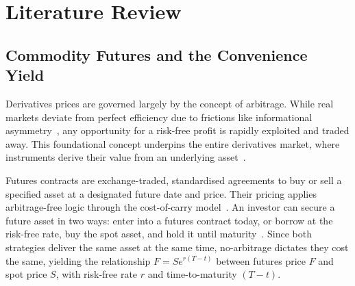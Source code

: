 \documentclass[sigconf, authorversion=true, nonacm=true]{acmart}
\begin{document}



\section{Literature Review}
\label{sec:literature}

\subsection{Commodity Futures and the Convenience Yield}
\label{sec:fin_fun}
\label{sec:lit_commodity_merged}
Derivatives prices are governed largely by the concept of arbitrage. While real markets deviate from perfect efficiency due to frictions like informational asymmetry~\cite{Fama1970EfficientWork, ShivakumarGT.2018TheEfficieny, deJong2009Introduction}, any opportunity for a risk-free profit is rapidly exploited and traded away. This foundational concept underpins the entire derivatives market, where instruments derive their value from an underlying asset~\cite{Hull2022OptionsDerivatives}.

Futures contracts are exchange-traded, standardised agreements to buy or sell a specified asset at a designated future date and price. Their pricing applies arbitrage-free logic through the cost-of-carry model~\cite{Hull2022OptionsDerivatives}. An investor can secure a future asset in two ways: enter into a futures contract today, or borrow at the risk-free rate, buy the spot asset, and hold it until maturity~\cite{Hull2022OptionsDerivatives}. Since both strategies deliver the same asset at the same time, no-arbitrage dictates they cost the same, yielding the relationship $F = Se^{r(T-t)}$ between futures price $F$ and spot price $S$, with risk-free rate $r$ and time-to-maturity $(T-t)$.
\end{document}
